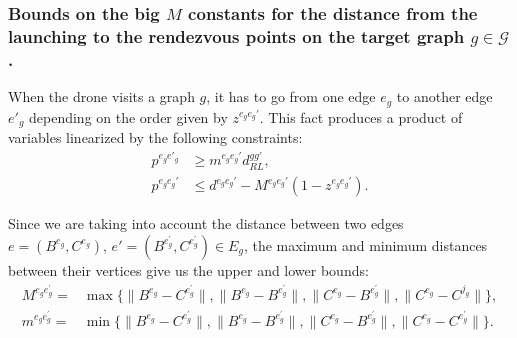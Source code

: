 


\subsubsection*{Bounds on the big $M$ constants for the distance from the launching to the rendezvous points on the target graph $g\in \mathcal{G}$.} 
\noindent
When the drone visits a graph $g$, it has to go from one edge $e_g$ to another edge $e'_g$ depending on the order given by $z^{e_ge_g'}$. This fact produces a product of variables linearized by the following constraints:
\begin{align*}
p^{e_ge'_g} & \geq m^{e_ge_g'} d_{RL}^{gg'}, \\
p^{e_ge_g'} & \leq d^{e_ge_g'} - M^{e_ge_g'}(1-z^{e_ge_g'}).
\end{align*}

\noindent
Since we are taking into account the distance between two edges $e=(B^{e_g},C^{e_g}), \, e'=(B^{e^\prime_g},C^{e^\prime_g})\in E_g$, the maximum and minimum distances between their vertices give us the upper and lower bounds:
\begin{align*}
M^{e_g e^\prime_g} = & \max\{\|B^{e_g} - C^{e^\prime_g}\|, \|B^{e_g} - B^{e^\prime_g}\|, \|C^{e_g} - B^{e^\prime_g}\|, \|C^{e_g} - C^{j_g}\|\}, \\
m^{e_g e^\prime_g} = & \min\{\|B^{e_g} - C^{e^\prime_g}\|, \|B^{e_g} - B^{e^\prime_g}\|, \|C^{e_g} - B^{e^\prime_g}\|, \|C^{e_g} - C^{e^\prime_g}\|\}.
\end{align*}

